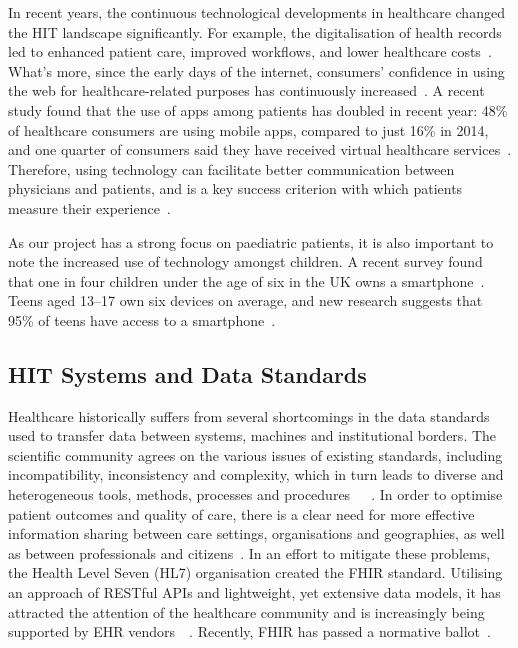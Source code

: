 \documentclass[sigconf]{acmart}
\begin{document}
In recent years, the continuous technological developments in healthcare changed the HIT landscape significantly. For example, the digitalisation of health records led to enhanced patient care, improved workflows, and lower healthcare costs~\cite{technology-impact}. What's more, since the early days of the internet, consumers' confidence in using the web for healthcare-related purposes has  continuously increased~\cite{health-informatics}. A recent study found that the use of apps among patients has doubled in recent year: 48\% of healthcare consumers are using mobile apps, compared to just 16\% in 2014, and one quarter of consumers said they have received virtual healthcare services~\cite{accenture-consumer-study}. Therefore, using technology can facilitate better communication between physicians and patients, and is a key success criterion with which patients measure their experience~\cite{digital-patient-experience}. %

As our project has a strong focus on paediatric patients, it is also important to note the increased use of technology amongst children. A recent survey found that one in four children under the age of six in the UK owns a smartphone~\cite{children-smartphones}. Teens aged 13--17 own six devices on average\cite{logicalis-realtime-generation}, and new research suggests that 95\% of teens have access to a smartphone~\cite{teens-technology}.


\subsection{HIT Systems and Data Standards}

Healthcare historically suffers from several shortcomings in the data standards used to transfer data between systems, machines and institutional borders. The scientific community agrees on the various issues of existing standards, including incompatibility, inconsistency and complexity, which in turn leads to diverse and heterogeneous tools, methods, processes and procedures~\cite{fhir-official}~\cite{using-fhir-mobile}~\cite{interoperabity-healthcare}. In order to optimise patient outcomes and quality of care, there is a clear need for more effective information sharing between care settings, organisations and geographies, as well as between professionals and citizens~\cite{nhs-interoperability}. In an effort to mitigate these problems, the Health Level Seven (HL7) organisation created the FHIR standard. Utilising an approach of RESTful APIs and lightweight, yet extensive data models, it has attracted the attention of the healthcare community and is increasingly being supported by EHR vendors~\cite{fhir-official}~\cite{using-fhir-mobile}. Recently, FHIR has passed a normative ballot~\cite{fhir-r4-release}.
\end{document}
